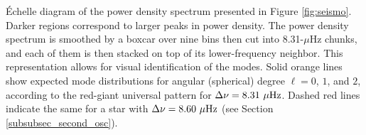 \label{fig:echelle} \'Echelle diagram of the power density spectrum presented in Figure \ref{fig:seismo}. Darker regions correspond to larger peaks in power density. The power density spectrum is smoothed by a boxcar over nine bins then cut into 8.31-$\mu$Hz chunks, and each of them is then stacked on top of its lower-frequency neighbor. This representation allows for visual identification of the modes. Solid orange lines show expected mode distributions for angular (spherical) degree $\ell = 0$, $1$, and $2$, according to the red-giant universal pattern \citep{mos11} for $\Delta\nu = 8.31\ \mu\rm{Hz}$. Dashed red lines indicate the same for a star with $\Delta\nu = 8.60\ \mu\rm{Hz}$ (see Section \ref{subsubsec_second_osc}).

  